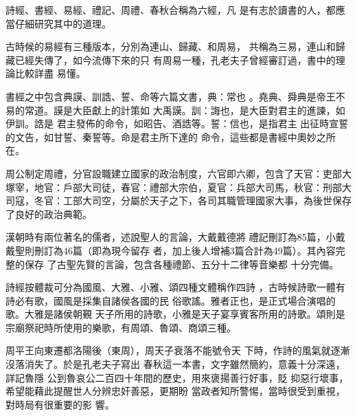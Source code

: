 \documentclass[avery5371,grid]{flashcards}
\begin{document}
{詩經、書經、易經、禮記、周禮、春秋合稱為六經，凡
是有志於讀書的人，都應當仔細研究其中的道理。} %
{} %

{古時候的易經有三種版本，分別為連山、歸藏、和周易，
共稱為三易，連山和歸藏已經失傳了，如今流傳下來的只
有周易一種，孔老夫子曾經審訂過，書中的理論比較詳盡
易懂。} %
{} %

{書經之中包含典謨、訓誥、誓、命等六篇文書，典：常也
。堯典、舜典是帝王不易的常道。謨是大臣獻上的計策如
大禹謨。訓：誨也，是大臣對君主的進諫，如伊訓。誥是
君主發佈的命令，如昭告、酒誥等。誓：信也，是指君主
出征時宣誓的文告，如甘誓、秦誓等。命是君主所下達的
命令，這些都是書經中奧妙之所在。} %
{} %

{周公制定周禮，分官設職建立國家的政治制度，六官即六卿，包含了天官：吏部大塚宰，地官：戶部大司徒，春官：禮部大宗伯，夏官：兵部大司馬，秋官：刑部大司寇，冬官：工部大司空，分屬於天子之下，各司其職管理國家大事，為後世保存了良好的政治典範。} %
{} %

{漢朝時有兩位著名的儒者，述說聖人的言論，大戴戴德將
禮記刪訂為85篇，小戴戴聖則刪訂為46篇（即為現今留存
者，加上後人增補3篇合計為49篇）。其內容完整的保存
了古聖先賢的言論，包含各種禮節、五分十二律等音樂都
十分完備。} %
{} %

{詩經按體裁可分為國風、大雅、小雅、頌四種文體稱作四詩
，古時候詩歌一體有詩必有歌，國風是採集自諸侯各國的民
俗歌謠。雅者正也，是正式場合演唱的歌。大雅是諸侯朝覲
天子所用的詩歌，小雅是天子宴享賓客所用的詩歌。頌則是
宗廟祭祀時所使用的樂歌，有周頌、魯頌、商頌三種。} %
{} %

{周平王向東遷都洛陽後（東周），周天子衰落不能號令天
下時，作詩的風氣就逐漸沒落消失了。於是孔老夫子寫出
春秋這一本書，文字雖然簡約，意義十分深遠，詳記魯隱
公到魯哀公二百四十年間的歷史，用來褒揚善行好事，貶
抑惡行壞事，希望能藉此提醒世人分辨忠奸善惡，更期盼
當政者知所警惕，當時很受到重視，對時局有很重要的影
響。} %
{} %
\end{document}
